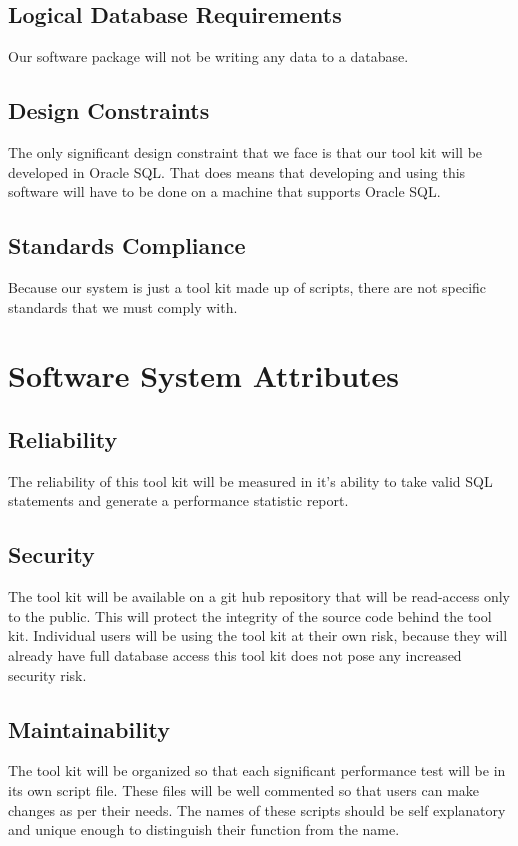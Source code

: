 \documentclass[draftclsnofoot, onecolumn, compsoc, 10pt]{IEEEtran}
\begin{document}
\subsection{Logical Database Requirements}
Our software package will not be writing any data to a database.

\subsection{Design Constraints}
The only significant design constraint that we face is that our tool kit will be developed in Oracle SQL. 
That does means that  developing and using this software will have to be done on a machine that supports Oracle SQL.

\subsection{Standards Compliance}
Because our system is just a tool kit made up of scripts, there are not specific standards that we must comply with. 

\section{Software System Attributes}

\subsection{Reliability}
The reliability of this tool kit will be measured in it's ability to take valid SQL statements and generate a performance statistic report. 

\subsection{Security}
The tool kit will be available on a git hub repository that will be read-access only to the public. 
This will protect the integrity of the source code behind the tool kit. 
Individual users will be using the tool kit at their own risk, because they will already have full database access this tool kit does not pose any increased security risk. 

\subsection{Maintainability}
The tool kit will be organized so that each significant performance test will be in its own script file. 
These files will be well commented so that users can make changes as per their needs. 
The names of these scripts should be self explanatory and unique enough to distinguish their function from the name. 
\end{document}
